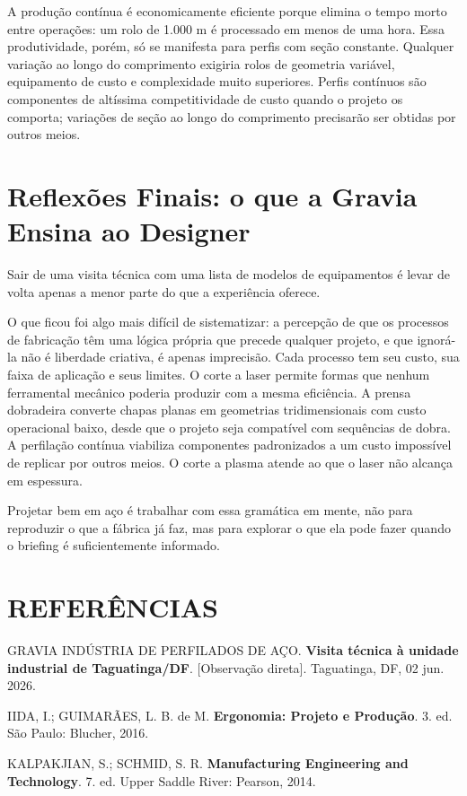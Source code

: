 \documentclass[12pt,a4paper,oneside,brazil,chapter=TITLE]{article}
\newcommand{\secbreak}{\clearpage}
\let\oldsection\section
\renewcommand{\section}{\secbreak\oldsection}
\begin{document}
A produção contínua é economicamente eficiente porque elimina o tempo morto entre operações: um rolo de 1.000 m é processado em menos de uma hora. Essa produtividade, porém, só se manifesta para perfis com seção constante. Qualquer variação ao longo do comprimento exigiria rolos de geometria variável, equipamento de custo e complexidade muito superiores. Perfis contínuos são componentes de altíssima competitividade de custo quando o projeto os comporta; variações de seção ao longo do comprimento precisarão ser obtidas por outros meios.

\section{Reflexões Finais: o que a Gravia Ensina ao Designer}

Sair de uma visita técnica com uma lista de modelos de equipamentos é levar de volta apenas a menor parte do que a experiência oferece.

O que ficou foi algo mais difícil de sistematizar: a percepção de que os processos de fabricação têm uma lógica própria que precede qualquer projeto, e que ignorá-la não é liberdade criativa, é apenas imprecisão. Cada processo tem seu custo, sua faixa de aplicação e seus limites. O corte a laser permite formas que nenhum ferramental mecânico poderia produzir com a mesma eficiência. A prensa dobradeira converte chapas planas em geometrias tridimensionais com custo operacional baixo, desde que o projeto seja compatível com sequências de dobra. A perfilação contínua viabiliza componentes padronizados a um custo impossível de replicar por outros meios. O corte a plasma atende ao que o laser não alcança em espessura.

Projetar bem em aço é trabalhar com essa gramática em mente, não para reproduzir o que a fábrica já faz, mas para explorar o que ela pode fazer quando o briefing é suficientemente informado.

\section*{REFERÊNCIAS}
\label{referencias}

\noindent
GRAVIA INDÚSTRIA DE PERFILADOS DE AÇO. \textbf{Visita técnica à unidade industrial de Taguatinga/DF}. [Observação direta]. Taguatinga, DF, 02 jun. 2026.

\vspace{6pt}
\noindent
IIDA, I.; GUIMARÃES, L. B. de M. \textbf{Ergonomia: Projeto e Produção}. 3. ed. São Paulo: Blucher, 2016.

\vspace{6pt}
\noindent
KALPAKJIAN, S.; SCHMID, S. R. \textbf{Manufacturing Engineering and Technology}. 7. ed. Upper Saddle River: Pearson, 2014.
\end{document}
